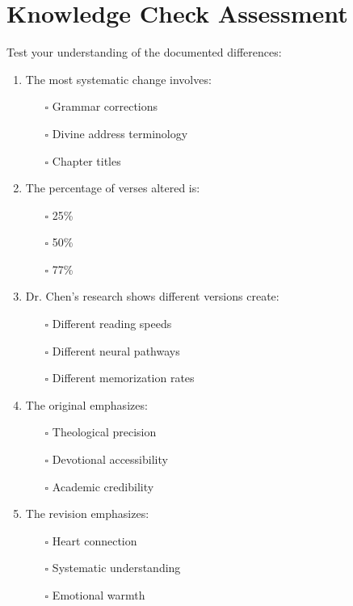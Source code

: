 \documentclass[11pt,twoside]{book}
\begin{document}
\section*{Knowledge Check Assessment}
\label{sec:org2013be3}

Test your understanding of the documented differences:

\begin{enumerate}
\item The most systematic change involves:
\begin{itemize}
\item[{$\square$}] Grammar corrections
\item[{$\square$}] Divine address terminology
\item[{$\square$}] Chapter titles
\end{itemize}

\item The percentage of verses altered is:
\begin{itemize}
\item[{$\square$}] 25\%
\item[{$\square$}] 50\%
\item[{$\square$}] 77\%
\end{itemize}

\item Dr. Chen's research shows different versions create:
\begin{itemize}
\item[{$\square$}] Different reading speeds
\item[{$\square$}] Different neural pathways
\item[{$\square$}] Different memorization rates
\end{itemize}

\item The original emphasizes:
\begin{itemize}
\item[{$\square$}] Theological precision
\item[{$\square$}] Devotional accessibility
\item[{$\square$}] Academic credibility
\end{itemize}

\item The revision emphasizes:
\begin{itemize}
\item[{$\square$}] Heart connection
\item[{$\square$}] Systematic understanding
\item[{$\square$}] Emotional warmth
\end{itemize}
\end{enumerate}
\end{document}
